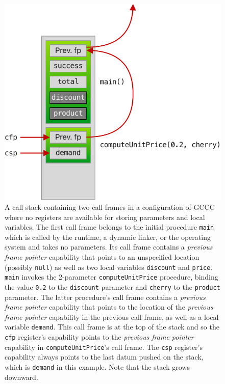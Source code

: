 \documentclass[main.tex]{subfiles}
\begin{document}
\begin{figure}
	\begin{center}
		\includegraphics{Images/GCCC Stack.pdf}
	\end{center}
	\caption{A call stack containing two call frames in a configuration of GCCC where no registers are available for storing parameters and local variables. The first call frame belongs to the initial procedure \texttt{main} which is called by the runtime, a dynamic linker, or the operating system and takes no parameters. Its call frame contains a \emph{previous frame pointer} capability that points to an unspecified location (possibly \texttt{null}) as well as two local variables \texttt{discount} and \texttt{price}. \texttt{main} invokes the 2-parameter \texttt{computeUnitPrice} procedure, binding the value \texttt{0.2} to the \texttt{discount} parameter and \texttt{cherry} to the \texttt{product} parameter. The latter procedure's call frame contains a \emph{previous frame pointer} capability that points to the location of the \emph{previous frame pointer} capability in the previous call frame, as well as a local variable \texttt{demand}. This call frame is at the top of the stack and so the \texttt{cfp} register's capability points to the \emph{previous frame pointer} capability in \texttt{computeUnitPrice}'s call frame. The \texttt{csp} register's capability always points to the last datum pushed on the stack, which is \texttt{demand} in this example. Note that the stack grows downward.}
	\label{fig:gcccstack}
\end{figure}
\end{document}
